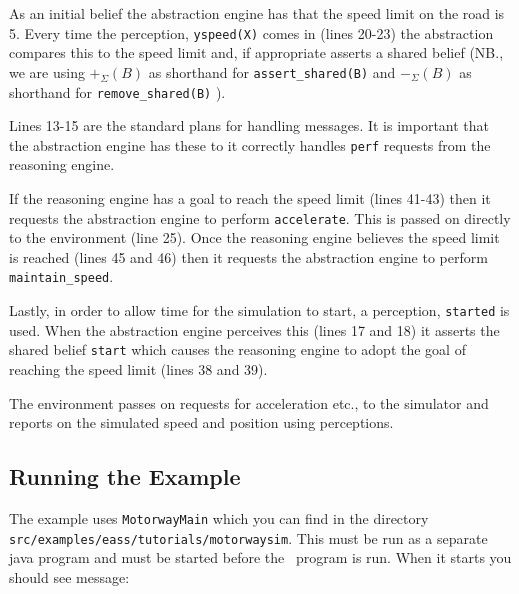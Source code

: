 As an initial belief the abstraction engine has that the speed limit on the road is 5.  Every time the perception, \lstinline{yspeed(X)} comes in (lines 20-23) the abstraction compares this to the speed limit and, if appropriate asserts a shared belief (NB., we are using $+_{\Sigma}(B)$ as shorthand for \lstinline{assert_shared(B)} and  $-_{\Sigma}(B)$ as shorthand for \lstinline{remove_shared(B)} ).

Lines 13-15 are the standard plans for handling messages.  It is important that the abstraction engine has these to it correctly handles \texttt{perf} requests from the reasoning engine.

If the reasoning engine has a goal to reach the speed limit (lines 41-43) then it requests the abstraction engine to perform \lstinline{accelerate}.  This is passed on directly to the environment (line 25).  Once the reasoning engine believes the speed limit is reached (lines 45 and 46) then it requests the abstraction engine to perform \lstinline{maintain_speed}.

Lastly, in order to allow time for the simulation to start, a perception, \lstinline{started} is used.  When the abstraction engine perceives this (lines 17 and 18) it asserts the shared belief \lstinline{start} which causes the reasoning engine to adopt the goal of reaching the speed limit (lines 38 and 39).

The environment passes on requests for acceleration etc., to the simulator and reports on the simulated speed and position using perceptions.

\subsection{Running the Example}

The example uses \texttt{MotorwayMain} which you can find in the directory \texttt{src/examples/eass/tutorials/motorwaysim}.  This must be run as a separate java program and must be started before the \eass\ program is run.  When it starts you should see message:

